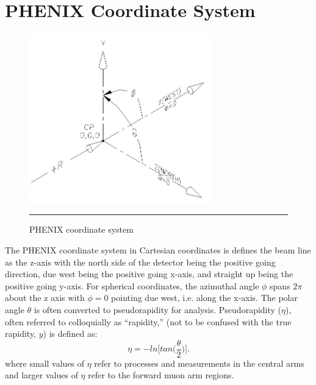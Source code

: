 \appendix
\chapter{PHENIX Coordinate System} %
\label{app:coordinates}
\begin{figure}[htbp!]
  \centering
    \includegraphics[width=0.7\textwidth]{Figures/coord2.jpg}
    \rule{35em}{0.5pt}
  \caption[PHENIX coordinate system]{PHENIX coordinate system}
  \label{fig:PHENIXcoord}
\end{figure}

The PHENIX coordinate system in Cartesian coordinates is defines the beam line as the z-axis with the north side of the detector being the positive going direction, due west being the positive going x-axis, and straight up being the positive going y-axis. For spherical coordinates, the azimuthal angle $\phi$ spans $2\pi$ about the z axis with $\phi=0$ pointing due west, i.e. along the x-axis. The polar angle $\theta$ is often converted to pseudorapidity for analysis. Pseudorapidity ($\eta$), often referred to colloquially as ``rapidity,'' (not to be confused with the true rapidity, $y$) is defined as:
\begin{equation}
\eta = - ln \bigg[ tan \bigg( \frac{\theta}{2} \bigg) \bigg].
\end{equation}
where small values of $\eta$ refer to processes and measurements in the central arms and larger values of $\eta$ refer to the forward muon arm regions.
